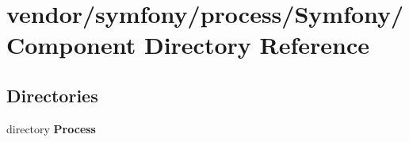 \section{vendor/symfony/process/\+Symfony/\+Component Directory Reference}
\label{dir_e8a54140d4bde09f624af31350579b12}
\subsection*{Directories}
\begin{DoxyCompactItemize}
\item 
directory {\bf Process}
\end{DoxyCompactItemize}
